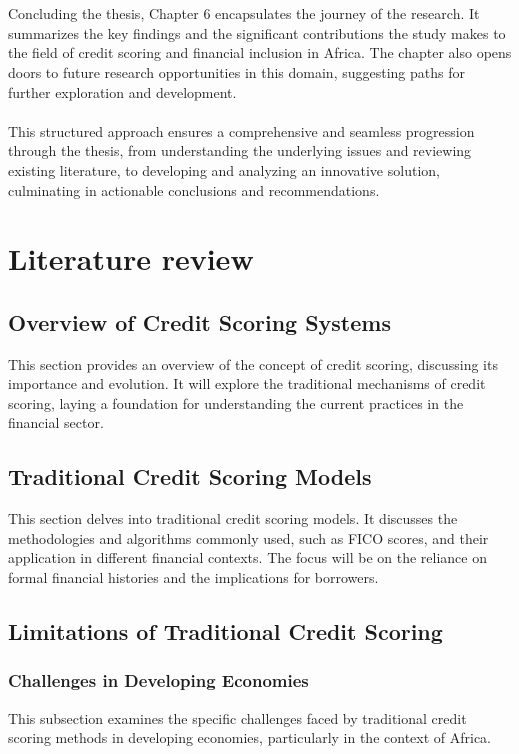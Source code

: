 \documentclass[a4paper,11pt,fleqn]{report}
\begin{document}
\\\\
Concluding the thesis, Chapter 6 encapsulates the journey of the research. It summarizes the key findings and the significant contributions the study makes to the field of credit scoring and financial inclusion in Africa. The chapter also opens doors to future research opportunities in this domain, suggesting paths for further exploration and development.
\\\\
This structured approach ensures a comprehensive and seamless progression through the thesis, from understanding the underlying issues and reviewing existing literature, to developing and analyzing an innovative solution, culminating in actionable conclusions and recommendations.



\chapter{Literature review}



\section{Overview of Credit Scoring Systems}
This section provides an overview of the concept of credit scoring, discussing its importance and evolution. It will explore the traditional mechanisms of credit scoring, laying a foundation for understanding the current practices in the financial sector.

\section{Traditional Credit Scoring Models}
This section delves into traditional credit scoring models. It discusses the methodologies and algorithms commonly used, such as FICO scores, and their application in different financial contexts. The focus will be on the reliance on formal financial histories and the implications for borrowers.

\section{Limitations of Traditional Credit Scoring}
\subsection{Challenges in Developing Economies}
This subsection examines the specific challenges faced by traditional credit scoring methods in developing economies, particularly in the context of Africa.
\end{document}
